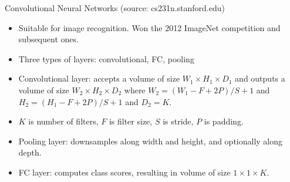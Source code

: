 \documentclass[final]{beamer}
\begin{document}
\begin{frame}{Convolutional Neural Networks (source: cs231n.stanford.edu)}
	\begin{itemize}
		\item Suitable for image recognition. Won the 2012 ImageNet competition and subsequent ones.
		\item Three types of layers: convolutional, FC, pooling
		\item Convolutional layer: accepts a volume of size $W_1 \times H_1 \times D_1$ and outputs a volume of size $W_2 \times H_2 \times D_2$ where $W_2 = (W_1 - F + 2P)/S + 1$ and $H_2 = (H_1 - F + 2P)/S + 1$ and $D_2 = K$.

		\item $K$ is number of filters, $F$ is filter size, $S$ is stride, $P$ is padding.
		\item Pooling layer: downsamples along width and height, and optionally along depth.
		\item FC layer: computes class scores, resulting in volume of size $1 \times 1 \times K$.

	
	\end{itemize}
\end{frame}
\end{document}
